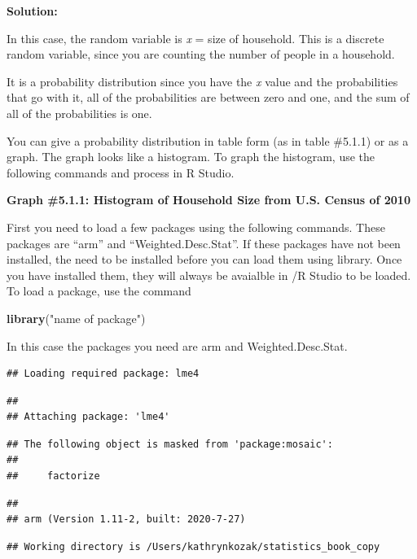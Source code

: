 \documentclass[
]{book}
\newenvironment{Shaded}{\begin{snugshade}}{\end{snugshade}}
\newcommand{\KeywordTok}[1]{\textcolor[rgb]{0.13,0.29,0.53}{\textbf{#1}}}
\newcommand{\NormalTok}[1]{#1}
\newcommand{\StringTok}[1]{\textcolor[rgb]{0.31,0.60,0.02}{#1}}
\begin{document}
\textbf{Solution:}

In this case, the random variable is \emph{x} = size of household. This is a discrete random variable, since you are counting the number of people in a household.

It is a probability distribution since you have the \emph{x} value and the probabilities that go with it, all of the probabilities are between zero and one, and the sum of all of the probabilities is one.

You can give a probability distribution in table form (as in table \#5.1.1) or as a graph. The graph looks like a histogram. To graph the histogram, use the following commands and process in R Studio.

\textbf{Graph \#5.1.1: Histogram of Household Size from U.S. Census of 2010}

First you need to load a few packages using the following commands. These packages are ``arm'' and ``Weighted.Desc.Stat''. If these packages have not been installed, the need to be installed before you can load them using library. Once you have installed them, they will always be avaialble in /R Studio to be loaded. To load a package, use the command

\begin{Shaded}
\begin{Highlighting}[]
\KeywordTok{library}\NormalTok{(}\StringTok{"name of package"}\NormalTok{) }
\end{Highlighting}
\end{Shaded}

In this case the packages you need are arm and Weighted.Desc.Stat.

\begin{verbatim}
## Loading required package: lme4
\end{verbatim}

\begin{verbatim}
## 
## Attaching package: 'lme4'
\end{verbatim}

\begin{verbatim}
## The following object is masked from 'package:mosaic':
## 
##     factorize
\end{verbatim}

\begin{verbatim}
## 
## arm (Version 1.11-2, built: 2020-7-27)
\end{verbatim}

\begin{verbatim}
## Working directory is /Users/kathrynkozak/statistics_book_copy
\end{verbatim}
\end{document}
